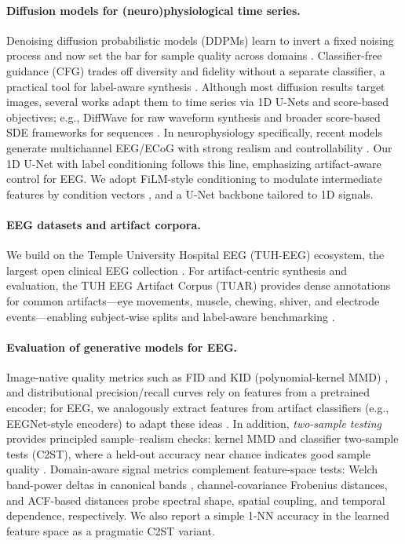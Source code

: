 \documentclass{article}
\begin{document}
\paragraph{Diffusion models for (neuro)physiological time series.}
Denoising diffusion probabilistic models (DDPMs) learn to invert a fixed noising process and now set the bar for sample quality across domains \citep{ho2020denoising,nichol2021improved,dhariwal2021dmbeatgans}. Classifier-free guidance (CFG) trades off diversity and fidelity without a separate classifier, a practical tool for label-aware synthesis \citep{ho2022classifierfree}. Although most diffusion results target images, several works adapt them to time series via 1D U-Nets and score-based objectives; e.g., DiffWave for raw waveform synthesis and broader score-based SDE frameworks for sequences \citep{kong2020diffwave,song2020scoresde}. In neurophysiology specifically, recent models generate multichannel EEG/ECoG with strong realism and controllability \citep{vetter2024nddm,tosato2023eegdiffusion}. Our 1D U-Net with label conditioning follows this line, emphasizing artifact-aware control for EEG. We adopt FiLM-style conditioning to modulate intermediate features by condition vectors \citep{perez2018film}, and a U-Net backbone \citep{ronneberger2015unet} tailored to 1D signals.

\paragraph{EEG datasets and artifact corpora.}
We build on the Temple University Hospital EEG (TUH-EEG) ecosystem, the largest open clinical EEG collection \citep{obeid2016tuh}. For artifact-centric synthesis and evaluation, the TUH EEG Artifact Corpus (TUAR) provides dense annotations for common artifacts—eye movements, muscle, chewing, shiver, and electrode events—enabling subject-wise splits and label-aware benchmarking \citep{hamid2020tuar}. 

\paragraph{Evaluation of generative models for EEG.}
Image-native quality metrics such as FID \citep{heusel2017fid} and KID (polynomial-kernel MMD) \citep{binkowski2018kid}, and distributional precision/recall curves \citep{sajjadi2018prd,kynkaanniemi2019prdc} rely on features from a pretrained encoder; for EEG, we analogously extract features from artifact classifiers (e.g., EEGNet-style encoders) to adapt these ideas \citep{lawhern2018eegnet}. In addition, \emph{two-sample testing} provides principled sample–realism checks: kernel MMD \citep{gretton2012mmd} and classifier two-sample tests (C2ST), where a held-out accuracy near chance indicates good sample quality \citep{lopezpaz2016c2st}. Domain-aware signal metrics complement feature-space tests: Welch band-power deltas in canonical bands \citep{welch1967psd}, channel-covariance Frobenius distances, and ACF-based distances probe spectral shape, spatial coupling, and temporal dependence, respectively. We also report a simple 1-NN accuracy in the learned feature space as a pragmatic C2ST variant. 
\end{document}

